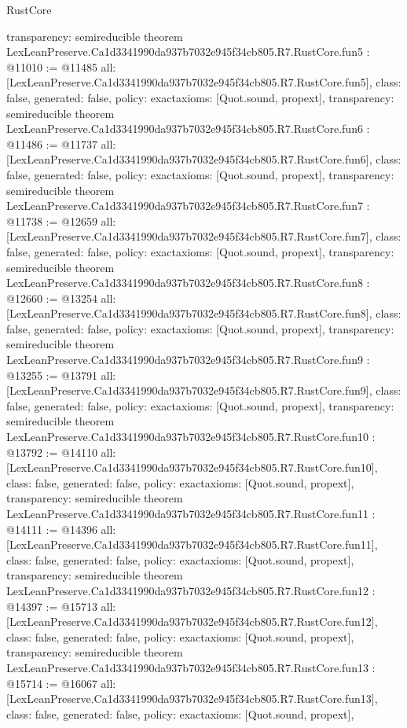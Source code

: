 \begin{lexlean}{RustCore}
\begin{coremodule}
{  transparency: semireducible
}
theorem LexLeanPreserve.Ca1d3341990da937b7032e945f34cb805.R7.RustCore.fun5 : @11010 := @11485 {
  all: [LexLeanPreserve.Ca1d3341990da937b7032e945f34cb805.R7.RustCore.fun5],
  class: false,
  generated: false,
  policy: exact{axioms: [Quot.sound, propext]},
  transparency: semireducible
}
theorem LexLeanPreserve.Ca1d3341990da937b7032e945f34cb805.R7.RustCore.fun6 : @11486 := @11737 {
  all: [LexLeanPreserve.Ca1d3341990da937b7032e945f34cb805.R7.RustCore.fun6],
  class: false,
  generated: false,
  policy: exact{axioms: [Quot.sound, propext]},
  transparency: semireducible
}
theorem LexLeanPreserve.Ca1d3341990da937b7032e945f34cb805.R7.RustCore.fun7 : @11738 := @12659 {
  all: [LexLeanPreserve.Ca1d3341990da937b7032e945f34cb805.R7.RustCore.fun7],
  class: false,
  generated: false,
  policy: exact{axioms: [Quot.sound, propext]},
  transparency: semireducible
}
theorem LexLeanPreserve.Ca1d3341990da937b7032e945f34cb805.R7.RustCore.fun8 : @12660 := @13254 {
  all: [LexLeanPreserve.Ca1d3341990da937b7032e945f34cb805.R7.RustCore.fun8],
  class: false,
  generated: false,
  policy: exact{axioms: [Quot.sound, propext]},
  transparency: semireducible
}
theorem LexLeanPreserve.Ca1d3341990da937b7032e945f34cb805.R7.RustCore.fun9 : @13255 := @13791 {
  all: [LexLeanPreserve.Ca1d3341990da937b7032e945f34cb805.R7.RustCore.fun9],
  class: false,
  generated: false,
  policy: exact{axioms: [Quot.sound, propext]},
  transparency: semireducible
}
theorem LexLeanPreserve.Ca1d3341990da937b7032e945f34cb805.R7.RustCore.fun10 : @13792 := @14110 {
  all: [LexLeanPreserve.Ca1d3341990da937b7032e945f34cb805.R7.RustCore.fun10],
  class: false,
  generated: false,
  policy: exact{axioms: [Quot.sound, propext]},
  transparency: semireducible
}
theorem LexLeanPreserve.Ca1d3341990da937b7032e945f34cb805.R7.RustCore.fun11 : @14111 := @14396 {
  all: [LexLeanPreserve.Ca1d3341990da937b7032e945f34cb805.R7.RustCore.fun11],
  class: false,
  generated: false,
  policy: exact{axioms: [Quot.sound, propext]},
  transparency: semireducible
}
theorem LexLeanPreserve.Ca1d3341990da937b7032e945f34cb805.R7.RustCore.fun12 : @14397 := @15713 {
  all: [LexLeanPreserve.Ca1d3341990da937b7032e945f34cb805.R7.RustCore.fun12],
  class: false,
  generated: false,
  policy: exact{axioms: [Quot.sound, propext]},
  transparency: semireducible
}
theorem LexLeanPreserve.Ca1d3341990da937b7032e945f34cb805.R7.RustCore.fun13 : @15714 := @16067 {
  all: [LexLeanPreserve.Ca1d3341990da937b7032e945f34cb805.R7.RustCore.fun13],
  class: false,
  generated: false,
  policy: exact{axioms: [Quot.sound, propext]},
}
\end{coremodule}
\end{lexlean}
